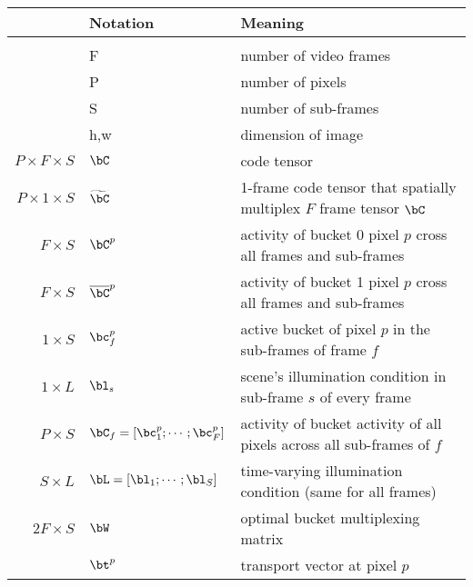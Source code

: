 \documentclass[../writeup.tex]{subfiles}
\begin{document}
\begin{table}[!htbp]
    \begin{center}
    \begin{tabular}{rll}
        \multicolumn{1}{r}{\bf} & \multicolumn{1}{l}{\bf Notation}   &\multicolumn{1}{l}{\bf Meaning}\\
        \hline \\
                             & F                                       & number of video frames \\
                             & P                                       & number of pixels \\
                             & S                                       & number of sub-frames \\
                             & h,w                                     & dimension of image \\
        $P\times F\times S$  & $\bC$                                   & code tensor \\
        $P\times 1\times S$  & $\widetilde{\bC}$                       & 1-frame code tensor that spatially multiplex $F$ frame tensor $\bC$ \\
        $F\times S$          & $\bC^p$                                 & activity of bucket 0 pixel $p$ cross all frames and sub-frames \\
        $F\times S$          & $\overline{\bC}^p$                       & activity of bucket 1 pixel $p$ cross all frames and sub-frames \\
        $1\times S$          & $\bc^p_f$                               & active bucket of pixel $p$ in the sub-frames of frame $f$ \\
        $1\times L$          & $\bl_s$                                 & scene's illumination condition in sub-frame $s$ of every frame \\
        $P\times S$          & $\bC_f=[\bc_1^p;\cdots;\bc_F^p]$        & activity of bucket activity of all pixels across all sub-frames of $f$ \\
        $S\times L$          & $\bL= [\bl_1;\cdots;\bl_S]$             & time-varying illumination condition (same for all frames) \\
        $2F\times S$         & $\bW$                                   & optimal bucket multiplexing matrix \\
                             & $\bt^p$                                 & transport vector at pixel $p$ \\

\end{tabular}
\end{center}
\end{table}
\end{document}
